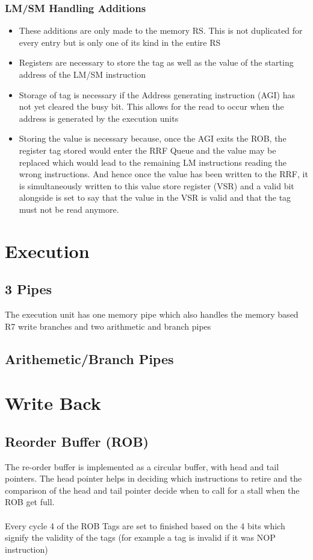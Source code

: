 \documentclass{article}
\begin{document}
\subsubsection{LM/SM Handling Additions}
\begin{itemize}
\item These additions are only made to the memory RS. This is not duplicated for every entry but is only one of its kind in the entire RS
\item Registers are necessary to store the tag as well as the value of the starting address of the LM/SM instruction
\item Storage of tag is necessary if the Address generating instruction (AGI) has not yet cleared the busy bit. This allows for the read to occur when the address is generated by the execution units
\item Storing the value is necessary because, once the AGI exits the ROB, the register tag stored would enter the RRF Queue and the value may be replaced which would lead to the remaining LM instructions reading the wrong instructions. And hence once the value has been written to the RRF, it is simultaneously written to this value store register (VSR) and a valid bit alongside is set to say that the value in the VSR is valid and that the tag must not be read anymore.
\end{itemize}

\section{Execution}
\subsection{3 Pipes}
The execution unit has one memory pipe which also handles the memory based R7 write branches and two arithmetic and branch pipes
\subsection{Arithemetic/Branch Pipes}
\section{Write Back}
\subsection{Reorder Buffer (ROB)}
The re-order buffer is implemented as a circular buffer, with head and tail pointers. The head pointer helps in deciding which instructions to retire and the comparison of the head and tail pointer decide when to call for a stall when the ROB get full. \\ \\
Every cycle 4 of the ROB Tags are set to finished based on the 4 bits which signify the validity of the tags (for example a tag is invalid if it was NOP instruction)
\end{document}
